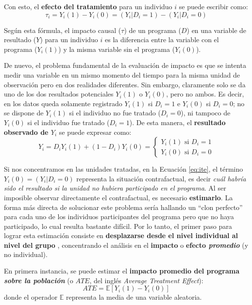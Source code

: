 \documentclass[../../main.tex]{subfiles}
\begin{document}
Con esto, el \textbf{efecto del tratamiento} para un individuo \(i\) se puede escribir como:
\begin{equation}
    \tau_i = Y_i(1) - Y_i(0) = (Y_i|D_i=1) - (Y_i|D_i=0)
    \label{eq:ite} %
\end{equation}

Según esta fórmula, el impacto causal (\(\tau\)) de un programa (\(D\)) en una variable de
resultado (\(Y\)) para un individuo \(i\) es la diferencia entre la variable con el
programa (\(Y_i(1)\)) y la misma variable sin el programa (\(Y_i(0)\)).

De nuevo, el problema fundamental de la evaluación de impacto es que se intenta medir una
variable en un mismo momento del tiempo para la misma unidad de observación pero en dos
realidades diferentes. Sin embargo, claramente solo se da uno de los dos resultados
potenciales \(Y_i(1)\) o \(Y_i(0)\), pero no ambos. Es decir, en los datos queda solamente
registrado \(Y_i(1)\) si \(D_i=1\) e \(Y_i(0)\) si \(D_i=0\); no se dispone de \(Y_i(1)\)
si el individuo no fue tratado (\(D_i=0\)), ni tampoco de \(Y_i(0)\) si el individuo fue
tratado (\(D_i=1\)). De esta manera, el \textbf{resultado observado de \(Y_i\)} se puede
expresar como:
\begin{equation}
    Y_i = D_i Y_i(1) + (1-D_i)Y_i(0) =
    \begin{cases}
        Y_i(1) \text{ si } D_i=1 \\
        Y_i(0) \text{ si } D_i=0
    \end{cases}
    \label{eq:observed-result}
\end{equation}

Si nos concentramos en las unidades tratadas, en la Ecuación \ref{eq:ite}, el término
\(Y_i(0) = (Y_i|D_i=0)\) representa la situación contrafactual, es decir \textit{cuál
habría sido el resultado si la unidad no hubiera participado en el programa}. Al ser
imposible observar directamente el contrafactual, es necesario \textbf{estimarlo}. La
forma más directa de solucionar este problema sería hallando un ``clon perfecto'' para
cada uno de los individuos participantes del programa pero que no haya participado, lo
cual resulta bastante difícil. Por lo tanto, el primer paso para lograr esta estimación
consiste en \textbf{desplazarse desde el nivel individual al nivel del grupo}
\cite{gertler-2016}, concentrando el análisis en el \textbf{impacto} o \textbf{efecto
\textit{promedio}} (y no individual).

En primera instancia, se puede estimar el \textbf{impacto promedio del programa
\textit{sobre la población}} (o \(ATE\), del inglés \textit{Average Treatment Effect}):
\begin{equation}
    ATE = \mathbb{E}\left[Y_i(1)-Y_i(0)\right]
\end{equation}
donde el operador \(\mathbb{E}\) representa la media de una variable aleatoria.
\end{document}
